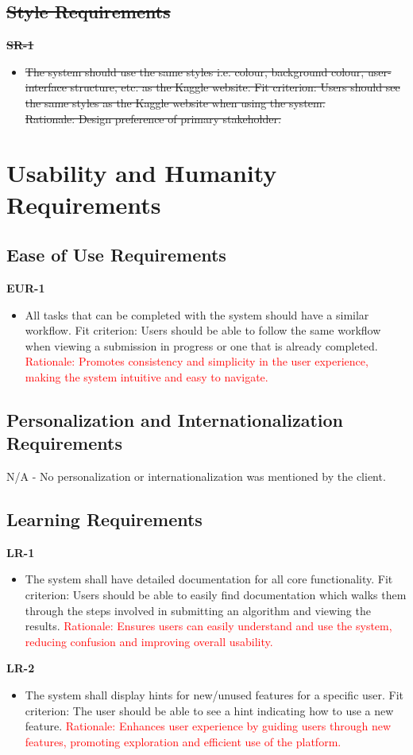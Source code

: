 \documentclass[12pt]{article}
\begin{document}
\subsection{\sout{Style Requirements}}
\textbf{\sout{SR-1}}
\begin{itemize}
    \item \sout{The system should use the same styles i.e. colour, background colour, user-interface structure, etc. as the Kaggle website. \hfill \break
    Fit criterion: Users should see the same styles as the Kaggle website when using the system. \\
    Rationale: Design preference of primary stakeholder.}
\end{itemize}


\section{Usability and Humanity Requirements}
\subsection{Ease of Use Requirements}
\textbf{EUR-1}
\begin{itemize}
    \item All tasks that can be completed with the system should have a similar workflow.\hfill \break
    Fit criterion: Users should be able to follow the same workflow when viewing a submission in progress or one that is already completed.
    \hfill \break
    \textcolor{red} {Rationale: Promotes consistency and simplicity in the user experience, making the system intuitive and easy to navigate.}
\end{itemize}
\subsection{Personalization and Internationalization Requirements}
N/A - No personalization or internationalization was mentioned by the client.
\subsection{Learning Requirements}
\textbf{LR-1}
\begin{itemize}
    \item The system shall have detailed documentation for all core functionality. \hfill \break
    Fit criterion: Users should be able to easily find documentation which walks them through the steps involved in submitting an algorithm and viewing the results.
    \hfill \break
    \textcolor{red} {Rationale: Ensures users can easily understand and use the system, reducing confusion and improving overall usability.}
\end{itemize}
\textbf{LR-2}
\begin{itemize}
    \item The system shall display hints for new/unused features for a specific user. \hfill \break
    Fit criterion: The user should be able to see a hint indicating how to use a new feature.
    \hfill \break
    \textcolor{red} {Rationale: Enhances user experience by guiding users through new features, promoting exploration and efficient use of the platform.}
\end{itemize}
\end{document}
